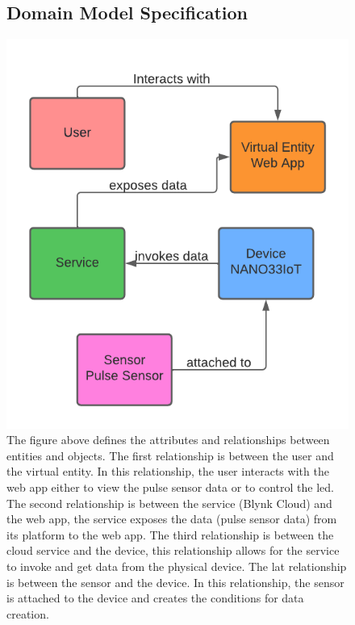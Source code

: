 \documentclass{report}
\begin{document}
\begin{figure}
\subsection{Domain Model Specification}
    \centering
    \includegraphics[scale=0.7]{images/step3(new).png}
    \caption{ The figure above defines the attributes and relationships between entities and objects. The first relationship is between the user and the virtual entity. In this relationship, the user interacts with the web app either to view the pulse sensor data or to control the led. The second relationship is between the service (Blynk Cloud) and the web app, the service exposes the data (pulse sensor data) from its platform to the web app. The third relationship is between the cloud service and the device, this relationship allows for the service to invoke and get data from the physical device. The lat relationship is between the sensor and the device. In this relationship, the sensor is attached to the device and creates the conditions for data creation.}
    \label{fig:image2}
\end{figure}
\end{document}
